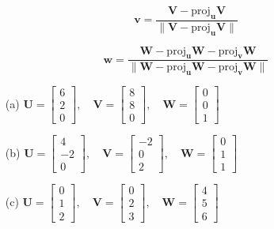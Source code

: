 \[
\mathbf{v} = \frac{\mathbf{V} - \text{proj}_{\mathbf{u}} \mathbf{V}}{\|\mathbf{V} - \text{proj}_{\mathbf{u}} \mathbf{V}\|}
\]

\[
\mathbf{w} = \frac{\mathbf{W} - \text{proj}_{\mathbf{u}} \mathbf{W} - \text{proj}_{\mathbf{v}} \mathbf{W}}{\|\mathbf{W} - \text{proj}_{\mathbf{u}} \mathbf{W} - \text{proj}_{\mathbf{v}} \mathbf{W}\|}
\]


\begin{enumerate}
    \item[(a)] 
    $\mathbf{U} = \begin{bmatrix} 6 \\ 2 \\ 0 \end{bmatrix}, \quad
    \mathbf{V} = \begin{bmatrix} 8 \\ 8 \\ 0 \end{bmatrix}, \quad
    \mathbf{W} = \begin{bmatrix} 0 \\ 0 \\ 1 \end{bmatrix}$
    
    \item[(b)] 
    $\mathbf{U} = \begin{bmatrix} 4 \\ -2 \\ 0 \end{bmatrix}, \quad
    \mathbf{V} = \begin{bmatrix} -2 \\ 0 \\ 2 \end{bmatrix}, \quad
    \mathbf{W} = \begin{bmatrix} 0 \\ 1 \\ 1 \end{bmatrix}$
    
    \item[(c)] 
    $\mathbf{U} = \begin{bmatrix} 0 \\ 1 \\ 2 \end{bmatrix}, \quad
    \mathbf{V} = \begin{bmatrix} 0 \\ 2 \\ 3 \end{bmatrix}, \quad
    \mathbf{W} = \begin{bmatrix} 4 \\ 5 \\ 6 \end{bmatrix}$
    

\end{enumerate}
